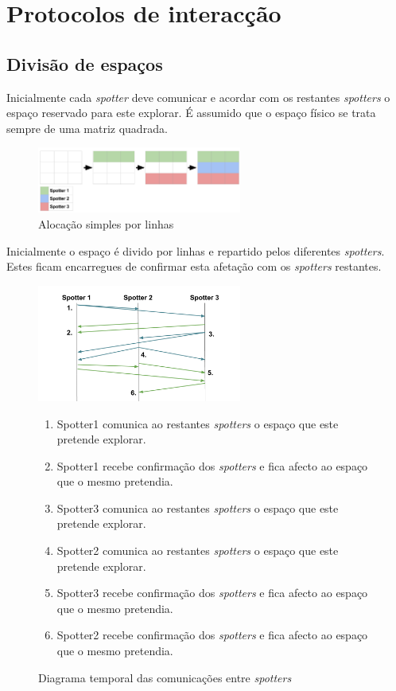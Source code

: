 \documentclass[12pt]{report}
\begin{document}
\section{Protocolos de interacção}

\subsection{Divisão de espaços}
Inicialmente cada \emph{spotter} deve comunicar e acordar com os restantes \emph{spotters} o espaço reservado para este explorar.
É assumido que o espaço físico se trata sempre de uma matriz quadrada.

\begin{figure}[h]
  \centering
    \includegraphics[width=0.6\textwidth]{spotter-spaces}
  \caption{\small{Alocação simples por linhas}}
\end{figure}

Inicialmente o espaço é divido por linhas e repartido pelos diferentes \emph{spotters}. Estes ficam encarregues de confirmar esta
afetação com os \emph{spotters} restantes.

\begin{figure}[h]
  \centering
    \includegraphics[width=0.6\textwidth]{spotter-agreement}
  \caption{\small{Diagrama temporal das comunicações entre \emph{spotters}}}
  
  \begin{enumerate}
    \item Spotter1 comunica ao restantes \emph{spotters} o espaço que este pretende explorar.
    \item Spotter1 recebe confirmação dos \emph{spotters} e fica afecto ao espaço que o mesmo pretendia.
    \item Spotter3 comunica ao restantes \emph{spotters} o espaço que este pretende explorar.
    \item Spotter2 comunica ao restantes \emph{spotters} o espaço que este pretende explorar.
    \item Spotter3 recebe confirmação dos \emph{spotters} e fica afecto ao espaço que o mesmo pretendia.
    \item Spotter2 recebe confirmação dos \emph{spotters} e fica afecto ao espaço que o mesmo pretendia.
  \end{enumerate}
\end{figure}
\end{document}

